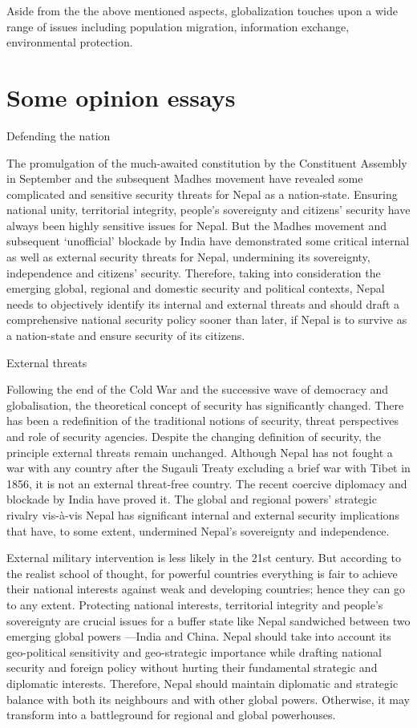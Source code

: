 \documentclass[
  openany]{book}
\begin{document}
Aside from the the above mentioned aspects, globalization touches upon a wide range of issues including population migration, information exchange, environmental protection.

\hypertarget{some-opinion-essays}{%
\section{Some opinion essays}\label{some-opinion-essays}}

Defending the nation

The promulgation of the much-awaited constitution by the Constituent Assembly in September and the subsequent Madhes movement have revealed some complicated and sensitive security threats for Nepal as a nation-state. Ensuring national unity, territorial integrity, people's sovereignty and citizens' security have always been highly sensitive issues for Nepal. But the Madhes movement and subsequent `unofficial' blockade by India have demonstrated some critical internal as well as external security threats for Nepal, undermining its sovereignty, independence and citizens' security. Therefore, taking into consideration the emerging global, regional and domestic security and political contexts, Nepal needs to objectively identify its internal and external threats and should draft a comprehensive national security policy sooner than later, if Nepal is to survive as a nation-state and ensure security of its citizens.

External threats

Following the end of the Cold War and the successive wave of democracy and globalisation, the theoretical concept of security has significantly changed. There has been a redefinition of the traditional notions of security, threat perspectives and role of security agencies. Despite the changing definition of security, the principle external threats remain unchanged. Although Nepal has not fought a war with any country after the Sugauli Treaty excluding a brief war with Tibet in 1856, it is not an external threat-free country. The recent coercive diplomacy and blockade by India have proved it. The global and regional powers' strategic rivalry vis-à-vis Nepal has significant internal and external security implications that have, to some extent, undermined Nepal's sovereignty and independence.

External military intervention is less likely in the 21st century. But according to the realist school of thought, for powerful countries everything is fair to achieve their national interests against weak and developing countries; hence they can go to any extent. Protecting national interests, territorial integrity and people's sovereignty are crucial issues for a buffer state like Nepal sandwiched between two emerging global powers ---India and China. Nepal should take into account its geo-political sensitivity and geo-strategic importance while drafting national security and foreign policy without hurting their fundamental strategic and diplomatic interests. Therefore, Nepal should maintain diplomatic and strategic balance with both its neighbours and with other global powers. Otherwise, it may transform into a battleground for regional and global powerhouses.
\end{document}
